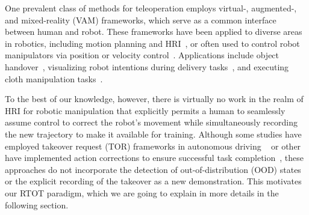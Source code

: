 One prevalent class of methods for teleoperation employs virtual-, augmented-, and mixed-reality (VAM) frameworks, which serve as a common interface between human and robot. These frameworks have been applied to diverse areas in robotics, including motion planning and HRI~\cite{makhataeva2020augmented}, or often used to control robot manipulators via position or velocity control~\cite{barentine2021vr, xu2022shared}. Applications include object handover~\cite{ortenzi2022robot}, visualizing robot intentions during delivery tasks~\cite{chandan2021arroch}, and executing cloth manipulation tasks~\cite{moletta2023virtual}.

To the best of our knowledge, however, there is virtually no work in the realm of HRI for robotic manipulation that explicitly permits a human to seamlessly assume control to correct the robot's movement while simultaneously recording the new trajectory to make it available for training. Although some studies have employed takeover request (TOR) frameworks in autonomous driving ~\cite{lindemann2019exploring} or other have implemented action corrections to ensure successful task completion~\cite{moletta2023virtual, ma2025human}, these approaches do not incorporate the detection of out-of-distribution (OOD) states or the explicit recording of the takeover as a new demonstration. This motivates our RTOT paradigm, which we are going to explain in more details in the following section.





